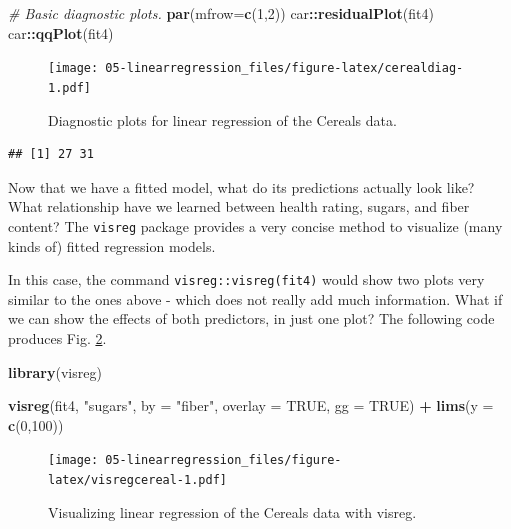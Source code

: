 \documentclass[]{book}
\newenvironment{Shaded}{\begin{snugshade}}{\end{snugshade}}
\newcommand{\CommentTok}[1]{\textcolor[rgb]{0.56,0.35,0.01}{\textit{#1}}}
\newcommand{\DataTypeTok}[1]{\textcolor[rgb]{0.13,0.29,0.53}{#1}}
\newcommand{\DecValTok}[1]{\textcolor[rgb]{0.00,0.00,0.81}{#1}}
\newcommand{\KeywordTok}[1]{\textcolor[rgb]{0.13,0.29,0.53}{\textbf{#1}}}
\newcommand{\NormalTok}[1]{#1}
\newcommand{\OperatorTok}[1]{\textcolor[rgb]{0.81,0.36,0.00}{\textbf{#1}}}
\newcommand{\OtherTok}[1]{\textcolor[rgb]{0.56,0.35,0.01}{#1}}
\newcommand{\StringTok}[1]{\textcolor[rgb]{0.31,0.60,0.02}{#1}}
\begin{document}
\begin{Shaded}
\begin{Highlighting}[]
\CommentTok{# Basic diagnostic plots.}
\KeywordTok{par}\NormalTok{(}\DataTypeTok{mfrow=}\KeywordTok{c}\NormalTok{(}\DecValTok{1}\NormalTok{,}\DecValTok{2}\NormalTok{))}
\NormalTok{car}\OperatorTok{::}\KeywordTok{residualPlot}\NormalTok{(fit4)}
\NormalTok{car}\OperatorTok{::}\KeywordTok{qqPlot}\NormalTok{(fit4)}
\end{Highlighting}
\end{Shaded}

\begin{figure}
\centering
\texttt{[image: 05-linearregression\_files/figure-latex/cerealdiag-1.pdf]}
\caption{\label{fig:cerealdiag}Diagnostic plots for linear regression of the Cereals data.}
\end{figure}

\begin{verbatim}
## [1] 27 31
\end{verbatim}

Now that we have a fitted model, what do its predictions actually look like? What relationship have we learned between health rating, sugars, and fiber content? The \texttt{visreg} package provides a very concise method to visualize (many kinds of) fitted regression models.

In this case, the command \texttt{visreg::visreg(fit4)} would show two plots very similar to the ones above - which does not really add much information. What if we can show the effects of both predictors, in just one plot? The following code produces Fig. \ref{fig:visregcereal}.

\begin{Shaded}
\begin{Highlighting}[]
\KeywordTok{library}\NormalTok{(visreg)}

\KeywordTok{visreg}\NormalTok{(fit4, }\StringTok{"sugars"}\NormalTok{, }\DataTypeTok{by =} \StringTok{"fiber"}\NormalTok{, }\DataTypeTok{overlay =} \OtherTok{TRUE}\NormalTok{, }
       \DataTypeTok{gg =} \OtherTok{TRUE}\NormalTok{) }\OperatorTok{+}\StringTok{ }
\StringTok{  }\KeywordTok{lims}\NormalTok{(}\DataTypeTok{y =} \KeywordTok{c}\NormalTok{(}\DecValTok{0}\NormalTok{,}\DecValTok{100}\NormalTok{))}
\end{Highlighting}
\end{Shaded}

\begin{figure}
\centering
\texttt{[image: 05-linearregression\_files/figure-latex/visregcereal-1.pdf]}
\caption{\label{fig:visregcereal}Visualizing linear regression of the Cereals data with visreg.}
\end{figure}
\end{document}
